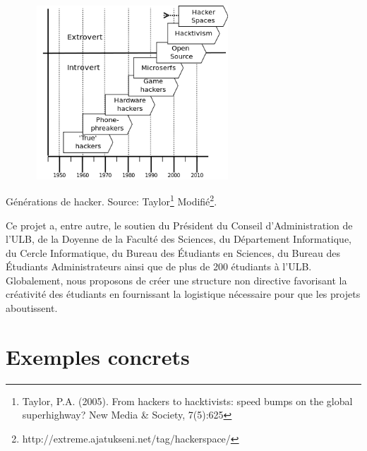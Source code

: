 \documentclass{article}
\begin{document}
\begin{center}
\includegraphics[height=65mm,width=95mm]{hacker-generations-divided.png}

Générations de hacker. Source: Taylor\footnote{Taylor,  P.A. (2005). From hackers to hacktivists: speed bumps on the global  superhighway? New Media \& Society, 7(5):625} Modifié\footnote{http://extreme.ajatukseni.net/tag/hackerspace/}.
\end{center}

Ce projet a, entre autre, le soutien du Président du Conseil d'Administration de l'ULB, de la Doyenne de la Faculté des Sciences, du Département Informatique, du Cercle Informatique, du Bureau des Étudiants en Sciences, du Bureau des Étudiants Administrateurs ainsi que de plus de 200 étudiants à l'ULB. Globalement, nous proposons de créer une structure non directive favorisant la créativité des étudiants en fournissant la logistique nécessaire pour que les projets aboutissent.

\section{Exemples concrets}
\end{document}
